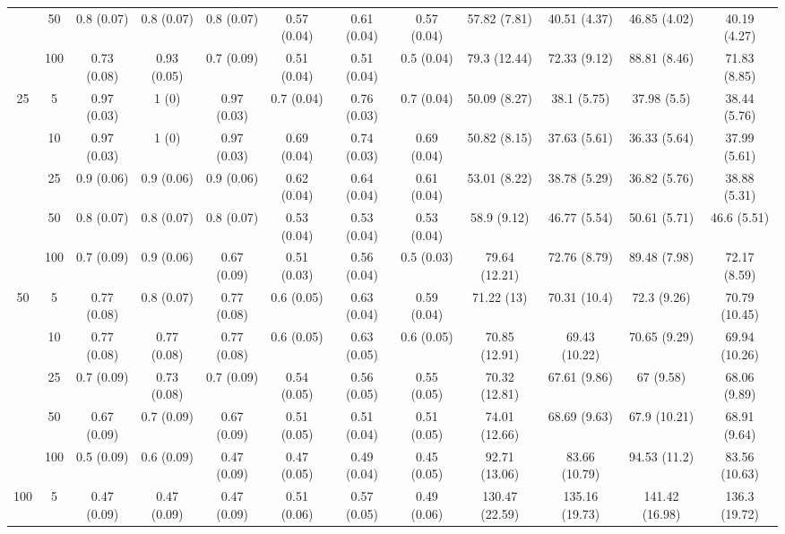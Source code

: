 \documentclass[11pt]{article}
\theoremstyle{definition}
\begin{document}
\begin{landscape}
\begin{table}[b]
\begin{center}
{\begin{tabular}{cc|ccc|ccc|cccc|}
    & 50  & 0.8 (0.07) & 0.8 (0.07) & 0.8 (0.07) & 0.57 (0.04) & 0.61 (0.04) & 0.57 (0.04) & 57.82 (7.81) & 40.51 (4.37) & 46.85 (4.02) & 40.19 (4.27) \\ 
    & 100  & 0.73 (0.08) & 0.93 (0.05) & 0.7 (0.09) & 0.51 (0.04) & 0.51 (0.04) & 0.5 (0.04) & 79.3 (12.44) & 72.33 (9.12) & 88.81 (8.46) & 71.83 (8.85) \\[.3cm] 
   \multirow{5}{*}{25} & 5  & 0.97 (0.03) & 1 (0) & 0.97 (0.03) & 0.7 (0.04) & 0.76 (0.03) & 0.7 (0.04) & 50.09 (8.27) & 38.1 (5.75) & 37.98 (5.5) & 38.44 (5.76) \\ 
    & 10  & 0.97 (0.03) & 1 (0) & 0.97 (0.03) & 0.69 (0.04) & 0.74 (0.03) & 0.69 (0.04) & 50.82 (8.15) & 37.63 (5.61) & 36.33 (5.64) & 37.99 (5.61) \\ 
    & 25  & 0.9 (0.06) & 0.9 (0.06) & 0.9 (0.06) & 0.62 (0.04) & 0.64 (0.04) & 0.61 (0.04) & 53.01 (8.22) & 38.78 (5.29) & 36.82 (5.76) & 38.88 (5.31) \\ 
    & 50  & 0.8 (0.07) & 0.8 (0.07) & 0.8 (0.07) & 0.53 (0.04) & 0.53 (0.04) & 0.53 (0.04) & 58.9 (9.12) & 46.77 (5.54) & 50.61 (5.71) & 46.6 (5.51) \\ 
    & 100  & 0.7 (0.09) & 0.9 (0.06) & 0.67 (0.09) & 0.51 (0.03) & 0.56 (0.04) & 0.5 (0.03) & 79.64 (12.21) & 72.76 (8.79) & 89.48 (7.98) & 72.17 (8.59) \\[.3cm] 
   \multirow{5}{*}{50} & 5  & 0.77 (0.08) & 0.8 (0.07) & 0.77 (0.08) & 0.6 (0.05) & 0.63 (0.04) & 0.59 (0.04) & 71.22 (13) & 70.31 (10.4) & 72.3 (9.26) & 70.79 (10.45) \\ 
    & 10  & 0.77 (0.08) & 0.77 (0.08) & 0.77 (0.08) & 0.6 (0.05) & 0.63 (0.05) & 0.6 (0.05) & 70.85 (12.91) & 69.43 (10.22) & 70.65 (9.29) & 69.94 (10.26) \\ 
    & 25  & 0.7 (0.09) & 0.73 (0.08) & 0.7 (0.09) & 0.54 (0.05) & 0.56 (0.05) & 0.55 (0.05) & 70.32 (12.81) & 67.61 (9.86) & 67 (9.58) & 68.06 (9.89) \\ 
    & 50  & 0.67 (0.09) & 0.7 (0.09) & 0.67 (0.09) & 0.51 (0.05) & 0.51 (0.04) & 0.51 (0.05) & 74.01 (12.66) & 68.69 (9.63) & 67.9 (10.21) & 68.91 (9.64) \\ 
    & 100  & 0.5 (0.09) & 0.6 (0.09) & 0.47 (0.09) & 0.47 (0.05) & 0.49 (0.04) & 0.45 (0.05) & 92.71 (13.06) & 83.66 (10.79) & 94.53 (11.2) & 83.56 (10.63)\\[.3cm] 
   \multirow{5}{*}{100} & 5  & 0.47 (0.09) & 0.47 (0.09) & 0.47 (0.09) & 0.51 (0.06) & 0.57 (0.05) & 0.49 (0.06) & 130.47 (22.59) & 135.16 (19.73) & 141.42 (16.98) & 136.3 (19.72) \\ 

\end{tabular}}
\end{center}
\end{table}
\end{landscape}
\end{document}
